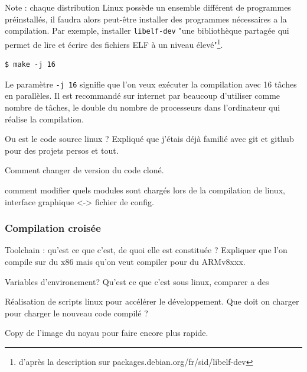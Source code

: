 Note : chaque distribution Linux possède un ensemble différent de programmes préinstallés, il faudra alors peut-être installer des programmes nécessaires a la compilation. Par exemple, installer \texttt{libelf-dev} "une bibliothèque partagée qui permet de lire et écrire des fichiers ELF à un niveau élevé"\footnote{d'après la description sur packages.debian.org/fr/sid/libelf-dev}. 

\begin{lstlisting}[style=command] 
$ make -j 16
\end{lstlisting}

Le paramètre \texttt{-j 16} signifie que l'on veux exécuter la compilation avec 16 tâches en parallèles. Il est recommandé sur internet par beaucoup d'utiliser comme nombre de tâches, le double du nombre de processeurs dans l'ordinateur qui réalise la compilation.



\vspace{20pt}
Ou est le code source linux ? Expliqué que j'étais déjà familié avec git et github pour des projets persos et tout.

Comment changer de version du code cloné. 

comment modifier quels modules sont chargés lors de la compilation de linux, interface graphique <-> fichier de config.
\subsubsection{Compilation croisée}

Toolchain : qu'est ce que c'est, de quoi elle est constituée ? Expliquer que l'on compile sur du x86 mais qu'on veut compiler pour du ARMv8xxx.

Variables d'environement? Qu'est ce que c'est sous linux, comparer a des 

Réalisation de scripts linux pour accélérer le développement. Que doit on charger pour charger le nouveau code compilé ?

Copy de l'image du noyau pour faire encore plus rapide.

